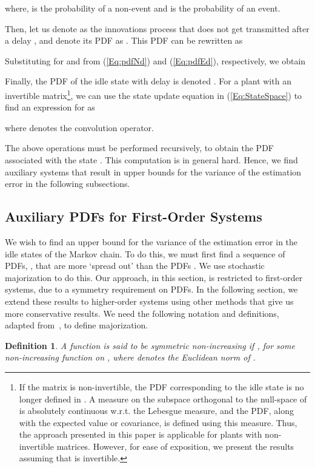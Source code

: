\documentclass[twocolumn]{autart}
\newtheorem{definition}{Definition}[section]
\begin{document}
where,  is the probability of a non-event and  is the probability of an event.

Then, let us denote  as the innovations process that does not get transmitted after a delay , and denote its PDF as . This PDF can be rewritten as

Substituting for  and  from (\ref{Eq:pdfNd}) and (\ref{Eq:pdfEd}), respectively, we obtain

Finally, the PDF of the idle state with delay  is denoted . For a plant with an invertible  matrix\footnote{If the matrix  is non-invertible, the PDF corresponding to the idle state is no longer defined in . A measure on the subspace orthogonal to the null-space of  is absolutely continuous w.r.t. the Lebesgue measure, and the PDF, along with the expected value or covariance, is defined using this measure. Thus, the approach presented in this paper is applicable for plants with non-invertible  matrices. However, for ease of exposition, we present the results assuming that  is invertible.}, we can use the state update equation in (\ref{Eq:StateSpace}) to find an expression for  as

where  denotes the convolution operator. 

The above operations must be performed recursively, to obtain the PDF associated with the state . This computation is in general hard. Hence, we find auxiliary systems that result in upper bounds for the variance of the estimation error in the following subsections.



\subsection{Auxiliary PDFs for First-Order Systems} \label{SS:PDFmaj}

We wish to find an upper bound for the variance of the estimation error in the idle states of the Markov chain. To do this, we must first find a sequence of PDFs, , that are more `spread out' than the PDFs . We use stochastic majorization to do this. Our approach, in this section, is restricted to first-order systems, due to a symmetry requirement on PDFs. In the following section, we extend these results to higher-order systems using other methods that give us more conservative results. We need the following notation and definitions, adapted from~\cite{Hajek2008}, to define majorization.

\begin{definition} \textbf{} \label{Def:SymmNIfunc}
A function  is said to be symmetric non-increasing if , for some non-increasing function  on , where  denotes the Euclidean norm of .
\end{definition}
\end{document}
